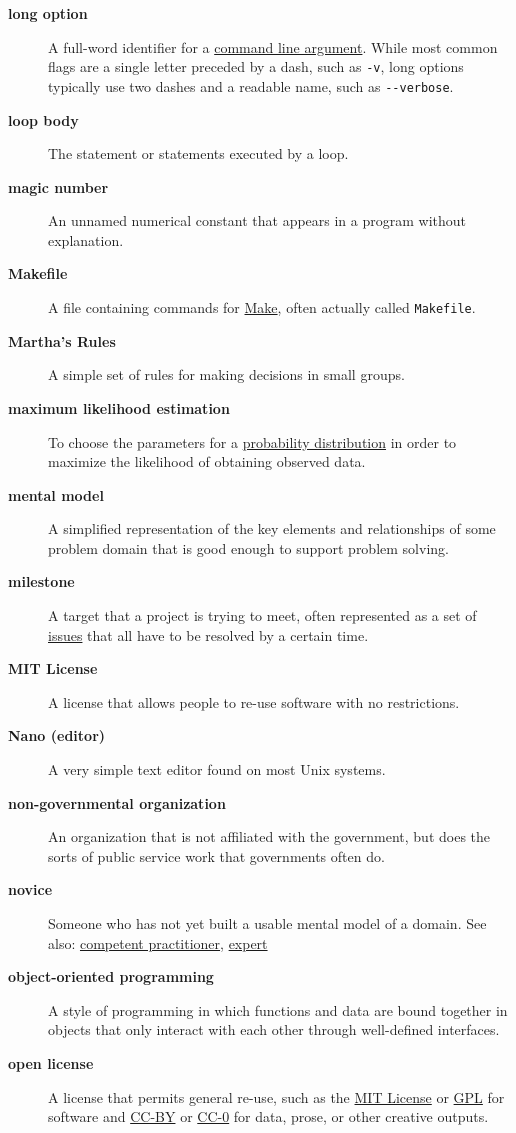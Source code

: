 \documentclass[
]{krantz}
\begin{document}
\begin{description}
\item[\textbf{long option}]
A full-word identifier for a \protect\hyperlink{command_line_argument}{command line argument}. While most common flags are a single letter preceded by a dash, such as \texttt{-v}, long options typically use two dashes and a readable name, such as \texttt{-\/-verbose}.
\item[\textbf{loop body}]
The statement or statements executed by a loop.
\item[\textbf{magic number}]
An unnamed numerical constant that appears in a program without explanation.
\item[\textbf{Makefile}]
A file containing commands for \protect\hyperlink{make}{Make}, often actually called \texttt{Makefile}.
\item[\textbf{Martha's Rules}]
A simple set of rules for making decisions in small groups.
\item[\textbf{maximum likelihood estimation}]
To choose the parameters for a \protect\hyperlink{probability_distribution}{probability distribution} in order to maximize the likelihood of obtaining observed data.
\item[\textbf{mental model}]
A simplified representation of the key elements and relationships of some problem domain that is good enough to support problem solving.
\item[\textbf{milestone}]
A target that a project is trying to meet, often represented as a set of \protect\hyperlink{issue}{issues} that all have to be resolved by a certain time.
\item[\textbf{MIT License}]
A license that allows people to re-use software with no restrictions.
\item[\textbf{Nano (editor)}]
A very simple text editor found on most Unix systems.
\item[\textbf{non-governmental organization}]
An organization that is not affiliated with the government, but does the sorts of public service work that governments often do.
\item[\textbf{novice}]
Someone who has not yet built a usable mental model of a domain. See also: \protect\hyperlink{competent_practitioner}{competent practitioner}, \protect\hyperlink{expert}{expert}
\item[\textbf{object-oriented programming}]
A style of programming in which functions and data are bound together in objects that only interact with each other through well-defined interfaces.
\item[\textbf{open license}]
A license that permits general re-use, such as the \protect\hyperlink{mit_license}{MIT License} or \protect\hyperlink{gpl}{GPL} for software and \protect\hyperlink{cc_by}{CC-BY} or \protect\hyperlink{cc_0}{CC-0} for data, prose, or other creative outputs.

\end{description}
\end{document}
